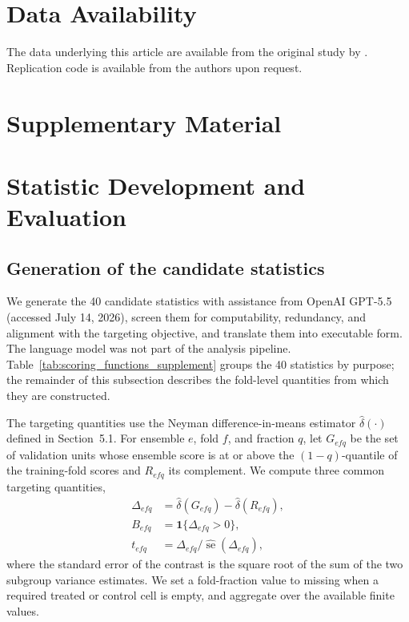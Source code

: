 \documentclass[12pt]{article}
\begin{document}
\section*{Data Availability}
The data underlying this article are available from the original study by \citet{alan2018}. Replication code is available from the authors upon request.

\newpage



\clearpage
\section*{Supplementary Material}
\setcounter{section}{0}
\renewcommand{\thesection}{S\arabic{section}}
\setcounter{subsection}{0}
\renewcommand{\thesubsection}{\thesection.\arabic{subsection}}
\setcounter{table}{0}
\renewcommand{\thetable}{S\arabic{table}}
\setcounter{figure}{0}
\renewcommand{\thefigure}{S\arabic{figure}}
\setcounter{equation}{0}
\renewcommand{\theequation}{S\arabic{equation}}

\section{Statistic Development and Evaluation}
\label{supp:development_provenance}

\subsection{Generation of the candidate statistics}
\label{supp:statistic_generation}
We generate the 40 candidate statistics with assistance from OpenAI GPT-5.5 (accessed July 14, 2026), screen them for computability, redundancy, and alignment with the targeting objective, and translate them into executable form. The language model was not part of the analysis pipeline. Table~\ref{tab:scoring_functions_supplement} groups the 40 statistics by purpose; the remainder of this subsection describes the fold-level quantities from which they are constructed.

The targeting quantities use the Neyman difference-in-means estimator $\widehat{\delta}(\cdot)$ defined in Section~5.1. For ensemble $e$, fold $f$, and fraction $q$, let $G_{efq}$ be the set of validation units whose ensemble score is at or above the $(1-q)$-quantile of the training-fold scores and $R_{efq}$ its complement. We compute three common targeting quantities,
\begin{align}
\Delta_{efq}&=\widehat{\delta}(G_{efq})-\widehat{\delta}(R_{efq}),\\
B_{efq}&=\mathbf 1\{\Delta_{efq}>0\},\\
t_{efq}&=\Delta_{efq}/\widehat{\operatorname{se}}(\Delta_{efq}),
\end{align}
where the standard error of the contrast is the square root of the sum of the two subgroup variance estimates. We set a fold-fraction value to missing when a required treated or control cell is empty, and aggregate over the available finite values.
\end{document}
